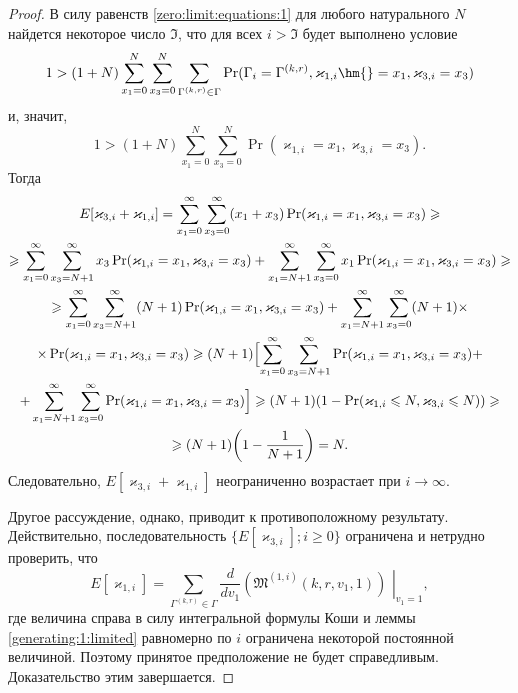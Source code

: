 \begin{proof}
В силу равенств \eqref{zero:limit:equations:1} для любого натурального $N$ найдется некоторое число $\mathfrak{I}$,  что для всех $i > \mathfrak{I}$ будет выполнено условие
$$1 > (1+N) \sum_{x_1=0}^{N}\sum_{x_3=0}^{N} \sum_{\Gamma^{(k, r)}\in \Gamma}  \Pr(\Gamma_{i}=\Gamma^{(k, r)},  \varkappa_{1, i} \hm{} = x_1,  \varkappa_{3, i}=x_3)$$
и,  значит,  
$$1 >(1+N) \sum_{x_1=0}^{N}\sum_{x_3=0}^{N} \Pr(\varkappa_{1, i} = x_1,  \varkappa_{3, i}=x_3)
.$$
Тогда
\begin{multline*}
E[\varkappa_{3, i}+\varkappa_{1, i}] = \sum_{x_1=0}^{\infty}\sum_{x_3=0}^{\infty} (x_1 + x_3) \Pr(\varkappa_{1, i} = x_1,  \varkappa_{3, i}=x_3) \geqslant \\
\geqslant
 \sum_{x_1=0}^{\infty}\sum_{x_3=N+1}^{\infty} x_3 \Pr(\varkappa_{1, i} = x_1,  \varkappa_{3, i}=x_3) +  \sum_{x_1=N+1}^{\infty}\sum_{x_3=0}^{\infty} x_1 \Pr(\varkappa_{1, i} = x_1,  \varkappa_{3, i}=x_3) \geqslant \\
 \geqslant
  \sum_{x_1=0}^{\infty}\sum_{x_3=N+1}^{\infty} (N+1) \Pr(\varkappa_{1, i} = x_1,  \varkappa_{3, i}=x_3) + \sum_{x_1=N+1}^{\infty}\sum_{x_3=0}^{\infty} (N+1) \times \\ \times \Pr(\varkappa_{1, i} = x_1,  \varkappa_{3, i}=x_3)
  \geqslant
  (N+1)\Bigl[\sum_{x_1=0}^{\infty}\sum_{x_3=N+1}^{\infty} \Pr(\varkappa_{1, i} = x_1,  \varkappa_{3, i}=x_3) + \\+ \sum_{x_1=N+1}^{\infty}\sum_{x_3=0}^{\infty}\Pr(\varkappa_{1, i} = x_1,  \varkappa_{3, i}=x_3)\Bigr] 
  \geqslant (N+1)(1-\Pr(\varkappa_{1, i} \leqslant N,  \varkappa_{3, i} \leqslant N)  ) 
  \geqslant \\ \geqslant
  (N+1)\biggl(1-\frac{1}{N+1}\biggr) = N.
\end{multline*}
Следовательно,  $E[\varkappa_{3, i}+\varkappa_{1, i}]$ неограниченно возрастает при $i \to \infty$. 

Другое рассуждение,  однако,  приводит к противоположному результату. Действительно,  последовательность $\{E[\varkappa_{3, i}]; i \geqslant 0\}$ ограничена  и нетрудно проверить,  что
$$
E[\varkappa_{1, i}] =\sum_{\Gamma^{(k, r)}\in \Gamma} \frac{d}{dv_1}\left.\left(\mathfrak{M}^{(1, i)}(k, r, v_1, 1)\right)\,\,\right|_{v_1=1}, 
$$
где величина справа в силу интегральной формулы Коши и леммы \ref{generating:1:limited} равномерно по $i$ ограничена некоторой постоянной величиной. 
 Поэтому принятое предположение не будет справедливым. Доказательство этим завершается.
\end{proof}

